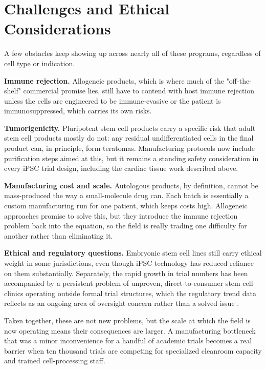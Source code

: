 \documentclass[11pt]{article}
\begin{document}
\section{Challenges and Ethical Considerations}

A few obstacles keep showing up across nearly all of these programs, regardless of cell type or indication.

\textbf{Immune rejection.} Allogeneic products, which is where much of the "off-the-shelf" commercial promise lies, still have to contend with host immune rejection unless the cells are engineered to be immune-evasive or the patient is immunosuppressed, which carries its own risks.

\textbf{Tumorigenicity.} Pluripotent stem cell products carry a specific risk that adult stem cell products mostly do not: any residual undifferentiated cells in the final product can, in principle, form teratomas. Manufacturing protocols now include purification steps aimed at this, but it remains a standing safety consideration in every iPSC trial design, including the cardiac tissue work described above.

\textbf{Manufacturing cost and scale.} Autologous products, by definition, cannot be mass-produced the way a small-molecule drug can. Each batch is essentially a custom manufacturing run for one patient, which keeps costs high. Allogeneic approaches promise to solve this, but they introduce the immune rejection problem back into the equation, so the field is really trading one difficulty for another rather than eliminating it.

\textbf{Ethical and regulatory questions.} Embryonic stem cell lines still carry ethical weight in some jurisdictions, even though iPSC technology has reduced reliance on them substantially. Separately, the rapid growth in trial numbers has been accompanied by a persistent problem of unproven, direct-to-consumer stem cell clinics operating outside formal trial structures, which the regulatory trend data reflects as an ongoing area of oversight concern rather than a solved issue \cite{panoramic2026}.

Taken together, these are not new problems, but the scale at which the field is now operating means their consequences are larger. A manufacturing bottleneck that was a minor inconvenience for a handful of academic trials becomes a real barrier when ten thousand trials are competing for specialized cleanroom capacity and trained cell-processing staff.
\end{document}
